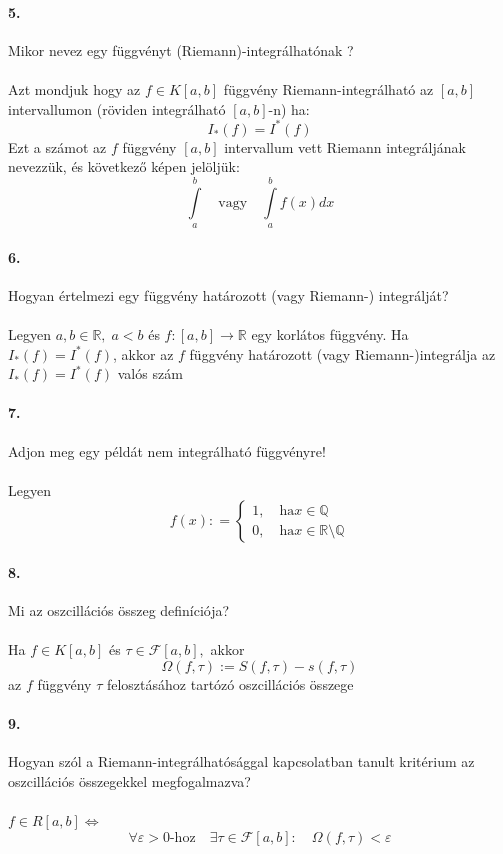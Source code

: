 \documentclass[10pt,a4paper]{article}
\newcommand{\R}{\mathbb{R}}
\renewcommand{\>}{\rightarrow}
\renewcommand{\r}{\tau}
\newcommand{\F}{\mathcal{F}}
\begin{document}
\paragraph{5. }
Mikor nevez egy függvényt (Riemann)-integrálhatónak ? \\\\
Azt mondjuk hogy az $f\in K[a,b]$ függvény Riemann-integrálható az $[a,b]$ intervallumon (röviden integrálható $[a,b]$-n) ha:
\[
I_*(f)=I^*(f)
\]
Ezt a számot az $f$ függvény $[a,b]$ intervallum vett Riemann integráljának nevezzük, és következő képen jelöljük:
\[
\int\limits_a^b \quad \text{vagy} \quad \int\limits_a^b f(x) dx  
\]
\paragraph{6. } Hogyan értelmezi egy függvény határozott (vagy Riemann-) integrálját? \\\\
Legyen $a,b \in \R , \; a<b$ és $f:[a,b] \> \R$ egy korlátos függvény. Ha $I_*(f)=I^*(f)$, akkor az $f$ függvény határozott (vagy Riemann-)integrálja az $I_*(f)=I^*(f)$ valós szám
\paragraph{7. } Adjon meg egy példát nem integrálható függvényre! \\\\ Legyen 
\[
f(x) : = \begin{cases}
1, \quad \text{ha} x \in \mathbb{Q} \\
0, \quad \text{ha} x \in \R \setminus \mathbb{Q}
\end{cases}
\]
\paragraph{8. } Mi az oszcillációs összeg definíciója? \\\\
Ha $f\in K[a,b]$ és $\r \in \F[a,b],$ akkor 
\[
\Omega (f,\r ) :=S(f,\r)-s(f,\r)
\]
az $f$ függvény $\r$ felosztásához tartózó oszcillációs összege
\paragraph{9. } Hogyan szól a Riemann-integrálhatósággal kapcsolatban tanult kritérium az oszcillációs összegekkel megfogalmazva? \\\\
$f\in R[a,b] \Longleftrightarrow$
\[
\forall \varepsilon > 0\text{-hoz} \quad \exists \r \in \mathcal{F}[a,b] : \quad \Omega (f,\r) < \varepsilon
\]
\end{document}

